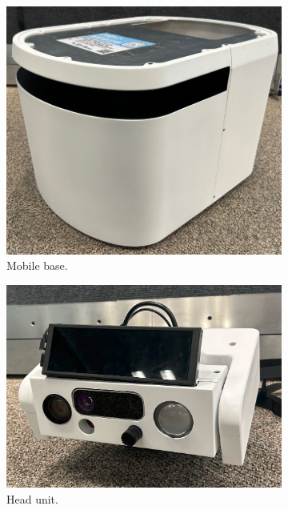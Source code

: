 \documentclass[runningheads,a4paper]{llncs}
\begin{document}
\begin{figure}[tbp]
	\centering
	\begin{subfigure}[t]{0.24\linewidth}
		\includegraphics[width=\linewidth]{images/component_base.png}
		\caption{Mobile base.}
	\end{subfigure}
	\begin{subfigure}[t]{0.24\linewidth}
		\includegraphics[width=\linewidth]{images/component_head.png}
		\caption{Head unit.}
	\end{subfigure}
	\begin{subfigure}[t]{0.24\linewidth}

\end{subfigure}
\end{figure}
\end{document}

